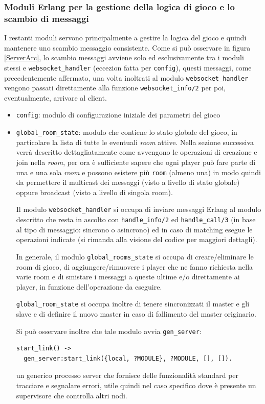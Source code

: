 \documentclass[paper=a4, fontsize=11pt]{scrartcl} %
\numberwithin{equation}{section} %
\numberwithin{figure}{section} %
\numberwithin{table}{section} %
\begin{document}
\subsubsection{Moduli Erlang per la gestione della logica di gioco e lo scambio di messaggi}
I restanti moduli servono principalmente a gestire la logica del gioco e quindi mantenere uno scambio messaggio consistente. Come si può osservare in figura \ref{ServerArc}, lo scambio messaggi avviene solo ed esclusivamente tra i moduli stessi e \texttt{websocket\_handler} (eccezion fatta per \texttt{config}), questi messaggi, come precedentemente affermato, una volta inoltrati al modulo \texttt{websocket\_handler} vengono passati direttamente alla funzione \texttt{websocket\_info/2} per poi, eventualmente, arrivare al client.
\begin{itemize}
\item \texttt{config}: modulo di configurazione iniziale dei parametri del gioco
\item \texttt{global\_room\_state}: modulo che contiene lo stato globale del gioco, in particolare la lista di tutte le eventuali \textit{room} attive. Nella sezione successiva verrà descritto dettagliatamente come avvengono le operazioni di creazione e join nella \textit{room}, per ora è sufficiente sapere che ogni player può fare parte di una e una sola \textit{room} e possono esistere più \texttt{room} (almeno una) in modo quindi da permettere il multicast dei messaggi (visto a livello di stato globale) oppure broadcast (visto a livello di singola room).

Il modulo \texttt{websocket\_handler} si occupa di inviare messaggi Erlang al modulo descritto che resta in ascolto con \texttt{handle\_info/2} ed \texttt{handle\_call/3} (in base al tipo di messaggio: sincrono o asincrono) ed in caso di matching esegue le operazioni indicate (si rimanda alla visione del codice per maggiori dettagli).

In generale, il modulo \texttt{global\_rooms\_state} si occupa di creare/eliminare le room di gioco, di aggiungere/rimuovere i player che ne fanno richiesta nella varie room e di smistare i messaggi a queste ultime e/o direttamente ai player, in funzione dell'operazione da eseguire.

\texttt{global\_room\_state} si occupa inoltre di tenere sincronizzati il master e gli slave e di definire il nuovo master in caso di fallimento del master originario.


Si può osservare inoltre che tale modulo avvia \texttt{gen\_server}:
\begin{lstlisting}[basicstyle=\footnotesize]
start_link() ->
  gen_server:start_link({local, ?MODULE}, ?MODULE, [], []).
\end{lstlisting}
un generico processo server che fornisce delle funzionalità standard per tracciare e segnalare errori, utile quindi nel caso specifico dove è presente un supervisore che controlla altri nodi.


\end{itemize}
\end{document}
